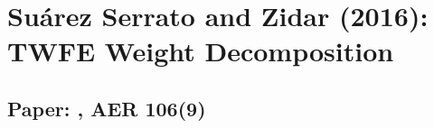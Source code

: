 \documentclass[12pt]{article}
\begin{document}
\section*{Su\'{a}rez Serrato and Zidar (2016): TWFE Weight Decomposition}
\subsection*{Paper: , AER 106(9)}




\end{document}
